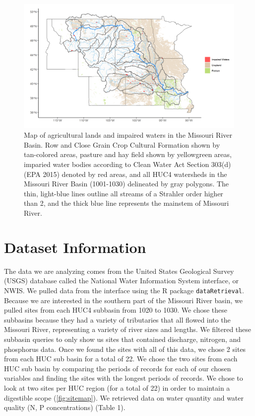 \documentclass[12pt,]{article}
\makeatletter
\def\maxwidth{\ifdim\Gin@nat@width>\linewidth\linewidth\else\Gin@nat@width\fi}
\makeatother
\begin{document}
\begin{figure}[H]
\includegraphics[width=\maxwidth]{../Figures/cropland3} \caption{\label{fig:cropland} Map of agricultural lands and impaired waters in the Missouri River Basin. Row and Close Grain Crop Cultural Formation shown by tan-colored areas, pasture and hay field shown by yellowgreen areas, imparied water bodies according to Clean Water Act Section 303(d) (EPA 2015) denoted by red areas, and all HUC4 watersheds in the Missouri River Basin (1001-1030) delineated by gray polygons. The thin, light-blue lines outline all streams of a Strahler order higher than 2, and the thick blue line represents the mainstem of Missouri River.}\label{fig:cropland}
\end{figure}

\newpage

\hypertarget{dataset-information}{%
\section{Dataset Information}\label{dataset-information}}

The data we are analyzing comes from the United States Geological Survey
(USGS) database called the National Water Information System interface,
or NWIS. We pulled data from the interface using the R package
\texttt{dataRetrieval}. Because we are interested in the southern part
of the Missouri River basin, we pulled sites from each HUC4 subbasin
from 1020 to 1030. We chose these subbasins because they had a variety
of tributaries that all flowed into the Missouri River, representing a
variety of river sizes and lengths. We filtered these subbasin queries
to only show us sites that contained discharge, nitrogen, and phosphorus
data. Once we found the sites with all of this data, we chose 2 sites
from each HUC sub basin for a total of 22. We chose the two sites from
each HUC sub basin by comparing the periods of records for each of our
chosen variables and finding the sites with the longest periods of
records. We chose to look at two sites per HUC region (for a total of
22) in order to maintain a digestible scope (\autoref{fig:sitemap}). We
retrieved data on water quantity and water quality (N, P concentrations)
(Table 1).
\end{document}
